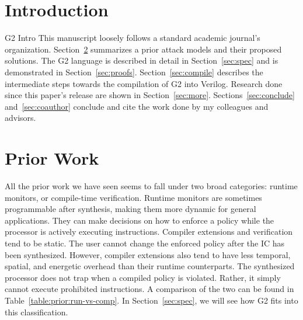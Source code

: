 \documentclass[sigconf,usenames,dvipsnames,svgnames,table]{acmart}
\def \sysname {\textsc{G2}\xspace}
\begin{document}

\maketitle
  \section{Introduction}\label{sec:intro}
    \sysname Intro
    \cite{2011gem5sim}
    \cite{2019stt}
    This manuscript loosely follows a standard academic journal's organization.
    Section~\ref{sec:priorwork} summarizes a prior attack models and their proposed solutions.
    The \sysname language is described in detail in Section~\ref{sec:spec} and is demonstrated in Section~\ref{sec:proofs}.
    Section~\ref{sec:compile} describes the intermediate steps towards the compilation of \sysname into Verilog.
    Research done since this paper's release are shown in Section~\ref{sec:more}.
    Sections~\ref{sec:conclude} and~\ref{sec:coauthor} conclude and cite the work done by my colleagues and advisors.


  \section{Prior Work}\label{sec:priorwork}
    All the prior work we have seen seems to fall under two broad categories: runtime monitors, or compile-time verification.
    Runtime monitors are sometimes programmable after synthesis, making them more dynamic for general applications.
    They can make decisions on how to enforce a policy while the processor is actively executing instructions.
    Compiler extensions and verification tend to be static.
    The user cannot change the enforced policy after the IC has been synthesized.
    However, compiler extensions also tend to have less temporal, spatial, and energetic overhead than their runtime counterparts.
    The synthesized processor does not trap when a compiled policy is violated.
    Rather, it simply cannot execute prohibited instructions. 
    A comparison of the two can be found in Table~\ref{table:prior:run-vs-comp}.
    In Section~\ref{sec:spec}, %
    we will see how \sysname fits into this classification.
\end{document}
